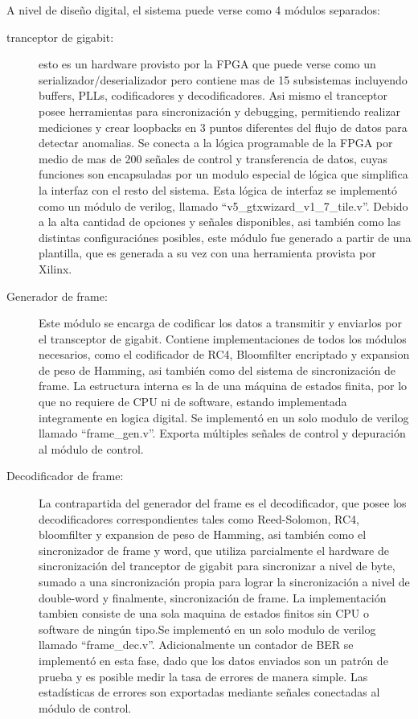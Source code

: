 A nivel de diseño digital, el sistema puede verse como 4 módulos separados:

\begin{description}
 \item[tranceptor de gigabit:] esto es un hardware provisto por la FPGA que puede verse como un serializador/deserializador pero contiene mas de 15 subsistemas incluyendo buffers, PLLs, codificadores y decodificadores. Asi mismo el tranceptor posee herramientas para sincronización y debugging, permitiendo realizar mediciones y crear loopbacks en 3 puntos diferentes del flujo de datos para detectar anomalias. Se conecta a la lógica programable de la FPGA por medio de mas de 200 señales de control y transferencia de datos, cuyas funciones son encapsuladas por un modulo especial de lógica que simplifica la interfaz con el resto del sistema. Esta lógica de interfaz se implementó como un módulo de verilog, llamado ``v5\_gtxwizard\_v1\_7\_tile.v''. Debido a la alta cantidad de opciones y señales disponibles, asi también como las distintas configuraciónes posibles, este módulo fue generado a partir de una plantilla, que es generada a su vez con una herramienta provista por Xilinx.

 \item[Generador de frame:] Este módulo se encarga de codificar los datos a transmitir y enviarlos por el transceptor de gigabit. Contiene implementaciones de todos los módulos necesarios, como el codificador de RC4, Bloomfilter encriptado y expansion de peso de Hamming, asi también como del sistema de sincronización de frame. La estructura interna es la de una máquina de estados finita, por lo que no requiere de CPU ni de software, estando implementada integramente en logica digital. Se implementó en un solo modulo de verilog llamado ``frame\_gen.v''. Exporta múltiples señales de control y depuración al módulo de control.
 
 \item[Decodificador de frame:] La contrapartida del generador del frame es el decodificador, que posee los decodificadores correspondientes tales como Reed-Solomon, RC4, bloomfilter y expansion de peso de Hamming, asi también como el sincronizador de frame y word, que utiliza parcialmente el hardware de sincronización del tranceptor de gigabit para sincronizar a nivel de byte, sumado a una sincronización propia para lograr la sincronización a nivel de double-word y finalmente, sincronización de frame. La implementación tambien consiste de una sola maquina de estados finitos sin CPU o software de ningún tipo.Se implementó en un solo modulo de verilog llamado ``frame\_dec.v''. Adicionalmente un contador de BER se implementó en esta fase, dado que los datos enviados son un patrón de prueba y es posible medir la tasa de errores de manera simple. Las estadísticas de errores son exportadas mediante señales conectadas al módulo de control.
 

\end{description}

